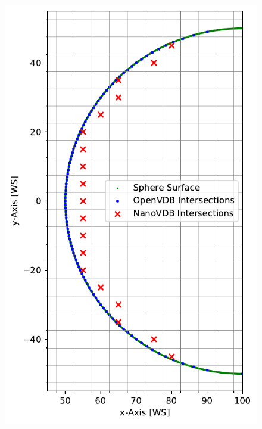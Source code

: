 \begin{figure}[h]
	\includegraphics[width=\linewidth]{res/intersection.pdf}
	\endminipage\hfill

\end{figure}
